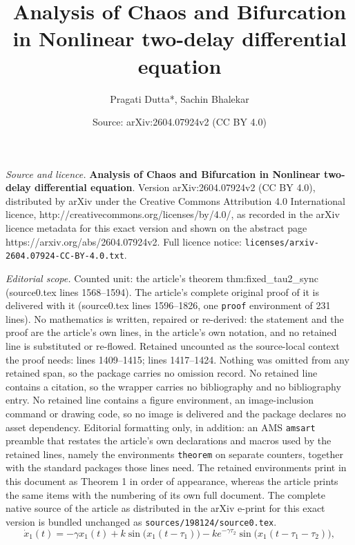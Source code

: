 \documentclass[10pt,a4paper]{amsart}
\title{\textbf{Analysis of Chaos and Bifurcation in Nonlinear two-delay differential equation}}
\author{Pragati Dutta*, Sachin Bhalekar}
\date{Source: arXiv:2604.07924v2 (CC BY 4.0)}
\begin{document}
\maketitle

\noindent\emph{Source and licence.} \textbf{Analysis of Chaos and Bifurcation in Nonlinear two-delay differential equation}. Version arXiv:2604.07924v2 (CC BY 4.0), distributed by arXiv under the Creative Commons Attribution 4.0 International licence, http://creativecommons.org/licenses/by/4.0/, as recorded in the arXiv licence metadata for this exact version and shown on the abstract page https://arxiv.org/abs/2604.07924v2. Full licence notice: \texttt{licenses/arxiv-2604.07924-CC-BY-4.0.txt}.\par\smallskip

\noindent\textit{Editorial scope.} Counted unit: the article's theorem thm:fixed\_tau2\_sync (source0.tex lines 1568--1594). The article's complete original proof of it is delivered with it (source0.tex lines 1596--1826, one \texttt{proof} environment of 231 lines). No mathematics is written, repaired or re-derived: the statement and the proof are the article's own lines, in the article's own notation, and no retained line is substituted or re-flowed.  Retained uncounted as the source-local context the proof needs: lines 1409--1415; lines 1417--1424.  Nothing was omitted from any retained span, so the package carries no omission record.  No retained line contains a citation, so the wrapper carries no bibliography and no bibliography entry.  No retained line contains a figure environment, an image-inclusion command or drawing code, so no image is delivered and the package declares no asset dependency.  Editorial formatting only, in addition: an AMS \texttt{amsart} preamble that restates the article's own declarations and macros used by the retained lines, namely the environments \texttt{theorem} on separate counters, together with the standard packages those lines need.  The retained environments print in this document as Theorem 1 in order of appearance, whereas the article prints the same items with the numbering of its own full document.  The complete native source of the article as distributed in the arXiv e-print for this exact version is bundled unchanged as \texttt{sources/198124/source0.tex}.
\begin{equation}
	\dot{x}_1(t)
	= -\gamma x_1(t)
	+ k\sin\big(x_1(t - \tau_1)\big)
	- k e^{-\gamma \tau_2}\sin\big(x_1(t - \tau_1 - \tau_2)\big),
	\label{eq:ms}
\end{equation}
\end{document}
